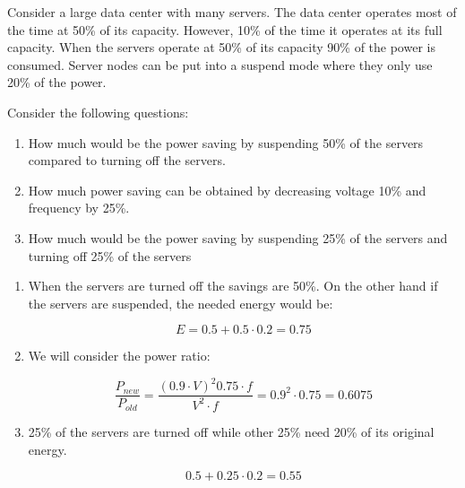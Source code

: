 \begin{acexercise}\end{acexercise}

Consider a large data center with many servers. The data center operates most of 
the time at 50\% of its capacity. However, 10\% of the time it operates at its
full capacity. When the servers operate at 50\% of its capacity 90\% of the power
is consumed. Server nodes can be put into a suspend mode where they only use
20\% of the power.

Consider the following questions:

\begin{enumerate}

\item How much would be the power saving by suspending 50\% of the servers
compared to turning off the servers.

\item How much power saving can be obtained by decreasing voltage 10\% and 
frequency by 25\%.

\item How much would be the power saving by suspending 25\% of the servers
and turning off 25\% of the servers

\end{enumerate}

\begin{acsolution}\end{acsolution}

\begin{enumerate}

\item When the servers are turned off the savings are 50\%. On the other hand
if the servers are suspended, the needed energy would be:

\[E = 0.5 + 0.5 \cdot 0.2 = 0.75\]

\item We will consider the power ratio:

\[
\frac{P_{new}}{P_{old}} =
\frac{(0.9 \cdot V)^2 0.75 \cdot f}{V^2 \cdot f} =
0.9^2 \cdot 0.75 =
0.6075
\]

\item 25\% of the servers are turned off while other 25\% need 20\% of
its original energy.

\[
0.5 + 0.25 \cdot 0.2 = 0.55
\]

\end{enumerate}

